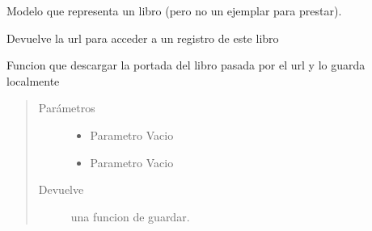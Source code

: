 \documentclass[letterpaper,10pt,spanish]{sphinxmanual}
\begin{document}
\begin{fulllineitems}
\label{\detokenize{modules/libro/models:libro.models.Libro}}
Modelo que representa un libro (pero no un ejemplar para prestar).

\begin{fulllineitems}
\label{\detokenize{modules/libro/models:libro.models.Libro.DoesNotExist}}
\end{fulllineitems}


\begin{fulllineitems}
\label{\detokenize{modules/libro/models:libro.models.Libro.MultipleObjectsReturned}}
\end{fulllineitems}


\begin{fulllineitems}
\label{\detokenize{modules/libro/models:libro.models.Libro.get_absolute_url}}
Devuelve la url para acceder a un registro de este libro

\end{fulllineitems}


\begin{fulllineitems}
\label{\detokenize{modules/libro/models:libro.models.Libro.save}}
Funcion que descargar la portada del libro pasada por el url y lo guarda localmente
\begin{quote}\begin{description}
\item[{Parámetros}] \leavevmode\begin{itemize}
\item {} 
 \textendash{} Parametro Vacio

\item {} 
 \textendash{} Parametro Vacio

\end{itemize}

\item[{Devuelve}] \leavevmode
una funcion de guardar.

\end{description}\end{quote}

\end{fulllineitems}


\end{fulllineitems}
\end{document}
